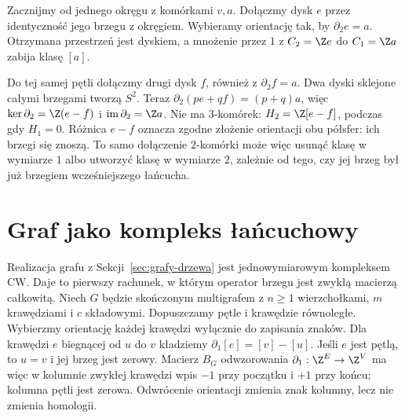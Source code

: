 \begin{przyklad}
\label{prz:dwa-dyski-homologia-8}
Zacznijmy od jednego okręgu z komórkami $v,a$.
Dołączmy dysk $e$ przez identyczność jego brzegu z okręgiem.
Wybieramy orientację tak, by $\partial_2e=a$.
Otrzymana przestrzeń jest dyskiem, a mnożenie przez $1$
z $C_2=\Z e$ do $C_1=\Z a$ zabija klasę $[a]$.

Do tej samej pętli dołączmy drugi dysk $f$, również z
$\partial_2f=a$. Dwa dyski sklejone całymi brzegami tworzą $S^2$.
Teraz $\partial_2(pe+qf)=(p+q)a$, więc
$\ker\partial_2=\Z(e-f)$ i $\operatorname{im}\partial_2=\Z a$.
Nie ma $3$-komórek: $H_2=\Z[e-f]$, podczas gdy $H_1=0$.
Różnica $e-f$ oznacza zgodne złożenie orientacji obu półsfer:
ich brzegi się znoszą. To samo dołączenie $2$-komórki może więc
usunąć klasę w wymiarze $1$ albo utworzyć klasę w wymiarze $2$,
zależnie od tego, czy jej brzeg był już brzegiem wcześniejszego łańcucha.
\end{przyklad}

\section{Graf jako kompleks łańcuchowy}
\label{sec:homologia-grafu-incydencja}

Realizacja grafu z Sekcji~\ref{sec:grafy-drzewa} jest
jednowymiarowym kompleksem CW. Daje to pierwszy rachunek,
w którym operator brzegu jest zwykłą macierzą całkowitą.
Niech $G$ będzie skończonym multigrafem z $n\geq1$
wierzchołkami, $m$ krawędziami i $c$ składowymi.
Dopuszczamy pętle i krawędzie równoległe. Wybierzmy
orientację każdej krawędzi wyłącznie do zapisania znaków.
Dla krawędzi $e$ biegnącej od $u$ do $v$ kładziemy
$\partial_1[e]=[v]-[u]$. Jeśli $e$ jest pętlą, to $u=v$
i jej brzeg jest zerowy. Macierz $B_G$ odwzorowania
$\partial_1:\Z^E\to\Z^V$ ma więc w kolumnie zwykłej
krawędzi wpis $-1$ przy początku i $+1$ przy końcu;
kolumna pętli jest zerowa. Odwrócenie orientacji zmienia
znak kolumny, lecz nie zmienia homologii.

